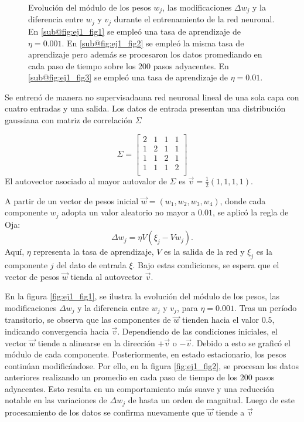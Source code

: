 \documentclass[aps,prb,twocolumn,superscriptaddress,floatfix,longbibliography]{revtex4-2}
\newcounter{para}
\begin{document}
\begin{figure}
\begin{subfigure}[b]{0.45\textwidth}
        \caption{\label{fig:ej1_fig3}}
    \end{subfigure}
       \caption{Evolución del módulo de los pesos $w_j$, las modificaciones $\Delta w_j$ y la diferencia entre $w_j$ y $v_j$ durante el entrenamiento de la red neuronal. En \ref{sub@fig:ej1_fig1} se empleó una tasa de aprendizaje de $\eta = 0.001$. En \ref{sub@fig:ej1_fig2} se empleó la misma tasa de aprendizaje pero además se procesaron los datos promediando en cada paso de tiempo sobre los 200 pasos adyacentes. En \ref{sub@fig:ej1_fig3} se empleó una tasa de aprendizaje de $\eta = 0.01$.}
       \label{fig:three graphs}
\end{figure}

Se entrenó de manera no supervisadauna red neuronal lineal de una sola capa con cuatro entradas y una salida. Los datos de entrada presentan una distribución gaussiana con matriz de correlación $\Sigma$



\[
\Sigma = \begin{bmatrix}
2 & 1 & 1 & 1 \\
1 & 2 & 1 & 1 \\
1 & 1 & 2 & 1 \\
1 & 1 & 1 & 2 \\
\end{bmatrix}
\]
El autovector asociado al mayor autovalor de $\Sigma$ es $\vec{v} = \frac{1}{2}(1, 1, 1, 1)$. 


A partir de un vector de pesos inicial $\vec{w} = (w_1, w_2, w_3, w_4)$, donde cada componente $w_j$ adopta un valor aleatorio no mayor a $0.01$, se aplicó la regla de Oja:
\[
\Delta w_j = \eta V ( \xi_j - V w_j ).
\]
Aquí, $\eta$ representa la tasa de aprendizaje, $V$ es la salida de la red y $\xi_j$ es la componente $j$ del dato de entrada $\xi$. Bajo estas condiciones, se espera que el vector de pesos $\vec{w}$ tienda al autovector $\vec{v}$.


En la figura \ref{fig:ej1_fig1}, se ilustra la evolución del módulo de los pesos, las modificaciones $\Delta w_j$ y la diferencia entre $w_j$ y $v_j$, para $\eta = 0.001$. Tras un período transitorio, se observa que las componentes de $\vec{w}$ tienden hacia el valor $0.5$, indicando convergencia hacia $\vec{v}$. Dependiendo de las condiciones iniciales, el vector $\vec{w}$ tiende a alinearse en la dirección $+\vec{v}$ o $-\vec{v}$. Debido a esto se graficó el módulo de cada componente. Posteriormente, en estado estacionario, los pesos continúan modificándose. Por ello, en la figura \ref{fig:ej1_fig2}, se procesan los datos anteriores realizando un promedio en cada paso de tiempo de los 200 pasos adyacentes. Esto resulta en un comportamiento más suave y una reducción notable en las variaciones de $\Delta w_j$ de hasta un orden de magnitud. Luego de este procesamiento de los datos se confirma nuevamente que $\vec{w}$ tiende a $\vec{v}$
\end{document}
